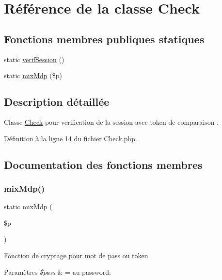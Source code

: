 \hypertarget{class_app_1_1_check}{}\section{Référence de la classe Check}
\label{class_app_1_1_check}
\subsection*{Fonctions membres publiques statiques}
\begin{DoxyCompactItemize}
\item 
static \hyperlink{class_app_1_1_check_a762802022c6341f5a11a5bd2d24e374a}{verif\+Session} ()
\item 
static \hyperlink{class_app_1_1_check_a6ad7e08262ba342da3f69a34a5536eb6}{mix\+Mdp} (\$p)
\end{DoxyCompactItemize}


\subsection{Description détaillée}
Classe \hyperlink{class_app_1_1_check}{Check} pour verification de la session avec token de comparaison . 

Définition à la ligne 14 du fichier Check.\+php.



\subsection{Documentation des fonctions membres}
\mbox{\label{class_app_1_1_check_a6ad7e08262ba342da3f69a34a5536eb6}} 
\subsubsection{\texorpdfstring{mix\+Mdp()}{mixMdp()}}
{\footnotesize\ttfamily static mix\+Mdp (\begin{DoxyParamCaption}\item[{}]{\$p }\end{DoxyParamCaption})\hspace{0.3cm}{\ttfamily [static]}}

Fonction de cryptage pour mot de pass ou token 
\begin{DoxyParams}{Paramètres}
{\em \$pass} & = au password. \\
\hline
\end{DoxyParams}


